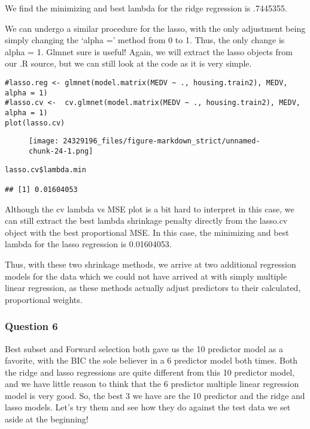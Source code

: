 \documentclass[]{article}
\begin{document}
We find the minimizing and best lambda for the ridge regression is
.7445355.

We can undergo a similar procedure for the lasso, with the only
adjustment being simply changing the `alpha =' method from 0 to 1. Thus,
the only change is alpha = 1. Glmnet sure is useful! Again, we will
extract the lasso objects from our .R source, but we can still look at
the code as it is very simple.

\begin{verbatim}
#lasso.reg <- glmnet(model.matrix(MEDV ~ ., housing.train2), MEDV, alpha = 1)
#lasso.cv <-  cv.glmnet(model.matrix(MEDV ~ ., housing.train2), MEDV, alpha = 1)
plot(lasso.cv)
\end{verbatim}

\begin{figure}[htbp]
\centering
\texttt{[image: 24329196\_files/figure-markdown\_strict/unnamed-chunk-24-1.png]}
\end{figure}

\begin{verbatim}
lasso.cv$lambda.min

## [1] 0.01604053
\end{verbatim}

Although the cv lambda vs MSE plot is a bit hard to interpret in this
case, we can still extract the best lambda shrinkage penalty directly
from the lasso.cv object with the best proportional MSE. In this case,
the minimizing and best lambda for the lasso regression is 0.01604053.

Thus, with these two shrinkage methods, we arrive at two additional
regression models for the data which we could not have arrived at with
simply multiple linear regression, as these methods actually adjust
predictors to their calculated, proportional weights.

\subsubsection{Question 6}\label{question-6}

Best subset and Forward selection both gave us the 10 predictor model as
a favorite, with the BIC the sole believer in a 6 predictor model both
times. Both the ridge and lasso regressions are quite different from
this 10 predictor model, and we have little reason to think that the 6
predictor multiple linear regression model is very good. So, the best 3
we have are the 10 predictor and the ridge and lasso models. Let's try
them and see how they do against the test data we set aside at the
beginning!
\end{document}
